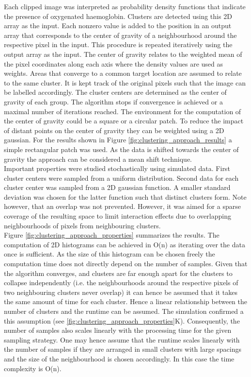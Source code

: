 Each clipped image was interpreted as probability density functions that indicate the presence of oxygenated haemoglobin. Clusters are detected using this 2D array as the input. Each nonzero value is added to the position in an output array that corresponds to the center of gravity of a neighbourhood around the respective pixel in the input. This procedure is repeated iteratively using the output array as the input. The center of gravity relates to the weighted mean of the pixel coordinates along each axis where the density values are used as weights. Areas that converge to a common target location are assumed to relate to the same cluster. It is kept track of the original pixels such that the image can be labelled accordingly. The cluster centers are determined as the center of gravity of each group. The algorithm stops if convergence is achieved or a maximal number of iterations reached. The environment for the computation of the center of gravity could be a square or a circular patch. To reduce the impact of distant points on the center of gravity they can be weighted using a 2D gaussian. For the results shown in Figure \ref{fig:clustering_approach_results} a simple rectangular patch was used. As the data is shifted towards the center of gravity the approach can be considered a mean shift technique. \\
Important properties were studied stochastically using simulated data. First cluster centers were sampled from a uniform distribution. Second data for each cluster center was sampled from a 2D gaussian function. A smaller standard deviation was chosen for the latter function such that distinct clusters form. Note however, that an overlap was not prevented. However, it was aimed for a sparse coverage of the resulting space to limit interaction effects due to overlapping neighbourhoods of pixels from neighbouring clusters.\\
Figure \ref{fig:clustering_approach_properties} summarizes the results. The computation of 2D histograms can be achieved in O(n) as iterating over the data once is sufficient. As the size of this histogram can be chosen freely the computation time does not directly depend on the number of samples. Given that the algorithm converges, and clusters are far enough apart for the clusters to collapse independently (i.e. the neighbourhoods around the respective pixels of two neighbouring clusters never overlap) it can hence be assumed that it takes the same amount of time for each cluster. Hence a linear relationship between the number of clusters and the runtime can be assumed. The simulation confirmed a this assumption (see \ref{fig:clustering_approach_properties}K). Consequently, the number of samples also scales linearly with the processing time for the given sampling strategy. One may hence assume that the runtime scales linearly with the number of samples if they are arranged in small clusters with large spacings and the size of the neighbourhood is chosen accordingly. In this case the time complexity is O(n).\\
